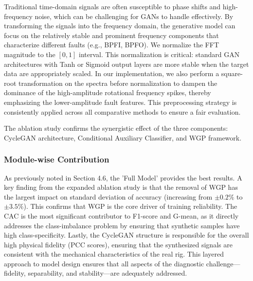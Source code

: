 Traditional time-domain signals are often susceptible to phase shifts and high-frequency noise, which can be challenging for GANs to handle effectively. By transforming the signals into the frequency domain, the generative model can focus on the relatively stable and prominent frequency components that characterize different faults (e.g., BPFI, BPFO). We normalize the FFT magnitude to the $[0, 1]$ interval. This normalization is critical: standard GAN architectures with Tanh or Sigmoid output layers are more stable when the target data are appropriately scaled. In our implementation, we also perform a square-root transformation on the spectra before normalization to dampen the dominance of the high-amplitude rotational frequency spikes, thereby emphasizing the lower-amplitude fault features. This preprocessing strategy is consistently applied across all comparative methods to ensure a fair evaluation.

The ablation study confirms the synergistic effect of the three components: CycleGAN architecture, Conditional Auxiliary Classifier, and WGP framework.

\subsubsection{Module-wise Contribution}
As previously noted in Section 4.6, the 'Full Model' provides the best results. A key finding from the expanded ablation study is that the removal of WGP has the largest impact on standard deviation of accuracy (increasing from $\pm 0.2\%$ to $\pm 3.5\%$). This confirms that WGP is the core driver of training reliability. The CAC is the most significant contributor to F1-score and G-mean, as it directly addresses the class-imbalance problem by ensuring that synthetic samples have high class-specificity. Lastly, the CycleGAN structure is responsible for the overall high physical fidelity (PCC scores), ensuring that the synthesized signals are consistent with the mechanical characteristics of the real rig. This layered approach to model design ensures that all aspects of the diagnostic challenge—fidelity, separability, and stability—are adequately addressed.

